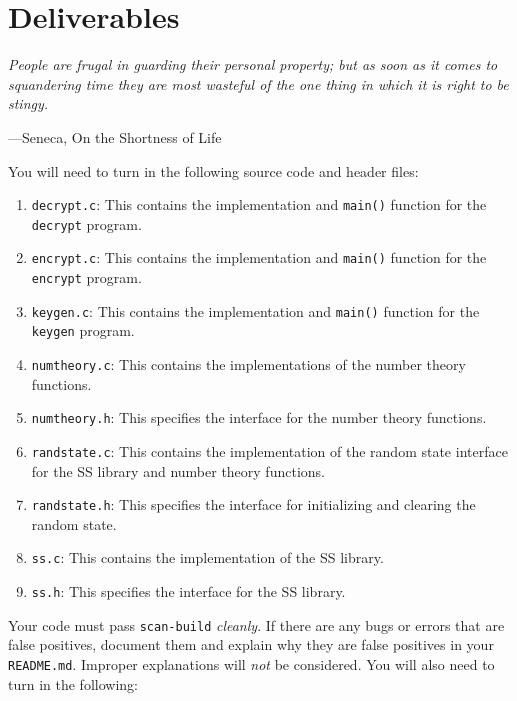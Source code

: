 \section{Deliverables}
\textwidth
\epigraph{\emph{People are frugal in guarding their personal property;
but as soon as it comes to squandering time they are most wasteful
of the one thing in which it is right to be stingy.}}{---Seneca,
On the Shortness of Life} \noindent You will need to turn in the
following source code and header files:

\begin{enumerate}
  \item \texttt{decrypt.c}: This contains the implementation and
    \texttt{main()} function for the \texttt{decrypt} program.

  \item \texttt{encrypt.c}: This contains the implementation and
    \texttt{main()} function for the \texttt{encrypt} program.

  \item \texttt{keygen.c}: This contains the implementation and
    \texttt{main()} function for the \texttt{keygen} program.

  \item \texttt{numtheory.c}: This contains the implementations of the
    number theory functions.

  \item \texttt{numtheory.h}: This specifies the interface for the
    number theory functions.

  \item \texttt{randstate.c}: This contains the implementation of the
    random state interface for the SS library and number theory
    functions.

  \item \texttt{randstate.h}: This specifies the interface for
    initializing and clearing the random state.

  \item \texttt{ss.c}: This contains the implementation of the SS
    library.

  \item \texttt{ss.h}: This specifies the interface for the SS
    library.
\end{enumerate}

Your code must pass \texttt{scan-build} \emph{cleanly}. If there are any
bugs or errors that are false positives, document them and explain why
they are false positives in your \texttt{README.md}. Improper
explanations will \emph{not} be considered. You will also need to turn
in the following:

